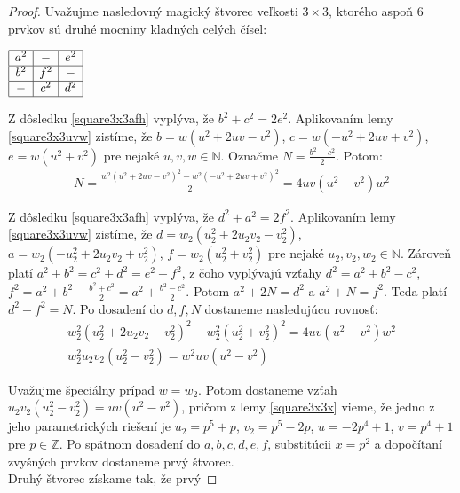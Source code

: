 \begin{proof} 
Uvažujme nasledovný magický štvorec veľkosti $3 \times 3$, ktorého aspoň $6$ prvkov sú druhé mocniny kladných celých čísel: \\

\begin{center}
$\begin{array}{ |c|c|c| } 
\hline
a^2 & - & e^2 \\ 
\hline
b^2 & f^2 & - \\ 
\hline
- & c^2 & d^2 \\
\hline
\end{array}$
\end{center}

Z dôsledku \ref{square3x3afh} vyplýva, že $b^2 + c^2 = 2e^2$. Aplikovaním lemy \ref{square3x3uvw} zistíme, že $b = w(u^2 + 2uv - v^2)$, $c = w(- u^2 + 2uv + v^2)$, $e = w(u^2 + v^2)$ pre nejaké $u,v,w \in \mathbb{N}$. Označme $N = \frac{b^2 - c^2}{2}$. Potom:
\begin{gather*}
N = \frac{w^2(u^2 + 2uv - v^2)^2 - w^2(- u^2 + 2uv + v^2)^2}{2} = 4uv(u^2 - v^2)w^2
\end{gather*}

Z dôsledku \ref{square3x3afh} vyplýva, že $d^2 + a^2 = 2f^2$. Aplikovaním lemy \ref{square3x3uvw} zistíme, že $d = w_2(u_2^2 + 2u_2 v_2 - v_2^2)$, $a = w_2(- u_2^2 + 2u_2 v_2 + v_2^2)$, $f = w_2(u_2^2 + v_2^2)$ pre nejaké $u_2,v_2,w_2 \in \mathbb{N}$. Zároveň platí $a^2 + b^2 = c^2 + d^2 = e^2 + f^2$, z čoho vyplývajú vzťahy $d^2 = a^2 + b^2 - c^2$, $f^2 = a^2 + b^2 - \frac{b^2 + c^2}{2} = a^2 + \frac{b^2 - c^2}{2}$.  Potom $a^2 + 2N = d^2$ a $a^2 + N = f^2$. Teda platí $d^2 - f^2 = N$. Po dosadení do $d,f,N$ dostaneme nasledujúcu rovnosť:
\begin{gather*}
w_2^2(u_2^2 + 2u_2 v_2 - v_2^2)^2 - w_2^2(u_2^2 + v_2^2)^2 = 4u v(u^2 - v^2)w^2 \\
w_2^2 u_2 v_2 (u_2^2 - v_2^2) = w^2 uv (u^2 - v^2)
\end{gather*}
 
Uvažujme špeciálny prípad $w = w_2$. Potom dostaneme vzťah $u_2 v_2 (u_2^2 - v_2^2) = uv (u^2 - v^2)$, pričom z lemy \ref{square3x3x} vieme, že jedno z jeho parametrických riešení je $u_2 = p^5 + p$, $v_2 = p^5 - 2p$, $u = -2p^4 + 1$, $v = p^4 + 1$ pre $p \in \mathbb{Z}$. Po spätnom dosadení do $a,b,c,d,e,f$, substitúcii $x = p^2$ a dopočítaní zvyšných prvkov dostaneme prvý štvorec. \\

Druhý štvorec získame tak, že prvý


\end{proof}
